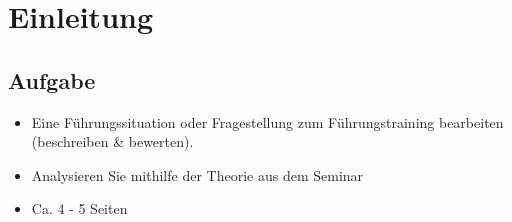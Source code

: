 \chapter{Einleitung}
\label{chap:einleitung}

\section*{Aufgabe}
\begin{itemize}
\item Eine Führungssituation oder Fragestellung zum Führungstraining bearbeiten (beschreiben \& bewerten).
\item Analysieren Sie mithilfe der Theorie aus dem Seminar
\item Ca. 4 - 5 Seiten
\end{itemize}





